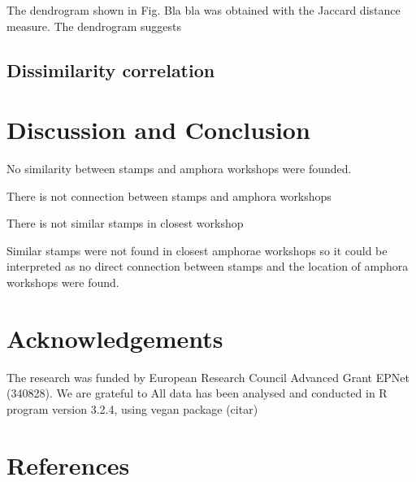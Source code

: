 \documentclass[review]{elsarticle}
\begin{document}
The dendrogram shown in Fig. Bla bla was obtained with the Jaccard distance measure. The dendrogram suggests 

\subsection{Dissimilarity correlation}


\section{Discussion and Conclusion}

No similarity between stamps and amphora workshops were founded. 

There is not connection between stamps and amphora workshops

There is not similar stamps in closest workshop 

Similar stamps were not found in closest amphorae workshops so it could be interpreted as no direct connection between stamps and the location of amphora workshops were found. 

\section{Acknowledgements}

The research was funded by European Research Council Advanced Grant
EPNet (340828). We are grateful to 
All data has been analysed and conducted in R program version 3.2.4, using vegan package (citar) 


\section{References}


\end{document}
